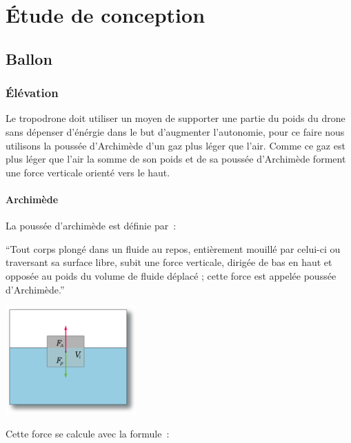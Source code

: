 \documentclass[a4paper,11pt]{article}
\begin{document}
\section{Étude de conception}

\subsection{Ballon}

\subsubsection{Élévation}

Le tropodrone doit utiliser un moyen de supporter une partie du poids du drone sans dépenser d'énérgie dans le but d'augmenter l'autonomie, pour ce faire nous utilisons la poussée d'Archimède d'un gaz plus léger que l'air. Comme ce gaz est plus léger que l'air la somme de son poids et de sa poussée d'Archimède forment une force verticale orienté vers le haut.

\paragraph{Archimède}

La poussée d'archimède est définie par~:

\enquote{Tout corps plongé dans un fluide au repos, entièrement mouillé par celui-ci ou traversant sa surface libre, subit une force verticale, dirigée de bas en haut et opposée au poids du volume de fluide déplacé ; cette force est appelée poussée d'Archimède.}

\begin{center}
	\includegraphics[width=5cm]{../Images/pousse_archimede.png}
\end{center}

Cette force se calcule avec la formule~:

\begin{center}
\end{center}
\end{document}

